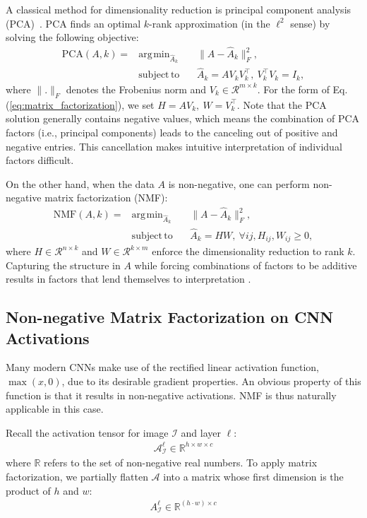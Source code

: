 \documentclass[runningheads]{llncs}
\DeclareMathOperator*{\argmin}{\arg\!\min}
\DeclareMathOperator*{\subjectto}{subject\,to\,}
\begin{document}
	A classical method for dimensionality reduction is principal component analysis (PCA)~\cite{jolliffe1986principal}.
	PCA finds an optimal $k$-rank approximation (in the $\ell^2$ sense) by solving the following objective:
	\begin{equation}
	\begin{aligned}
	\text{PCA}(A, k) = & \argmin_{\hat{A}_k}
	& & \|A-\hat{A}_k \|_F^2, \\
	& \subjectto
	& & \hat{A}_k = AV_kV_k^\top,~V_k^\top V_k = I_k,
	\end{aligned}
	\end{equation}
	where $\|.\|_F$ denotes the Frobenius norm and $V_k\in\mathcal{R}^{m\times k}$. For the form of Eq. (\ref{eq:matrix_factorization}), we set $H=AV_k,~W=V_k^\top$. Note that the PCA solution generally contains negative values, which means the  combination of PCA factors (i.e., principal components) leads to the canceling out of positive and negative entries. This cancellation makes intuitive interpretation of individual factors difficult.
	
	On the other hand, when the data $A$ is non-negative, one can perform non-negative matrix factorization (NMF):
	\begin{equation}
	\begin{aligned}
	\text{NMF}(A, k) = & \argmin_{\hat{A}_k}
	& & \|A-\hat{A}_k \|_F^2, \\
	& \subjectto
	& & \hat{A}_k = HW,~ \forall ij, H_{ij} ,W_{ij} \geq 0,
	\end{aligned}
	\end{equation}
	where $H\in\mathcal{R}^{n\times k}$ and $W\in\mathcal{R}^{k\times m}$ enforce the dimensionality reduction to rank $k$. Capturing the structure in $A$ while forcing combinations of factors to be additive results in factors that lend themselves to interpretation \cite{lee1999learning}.
	
	
	\subsection{Non-negative Matrix Factorization on CNN Activations} \label{sec: NMF on CNN Activations}
	Many modern CNNs make use of the rectified linear activation function, $\max(x, 0)$, due to its desirable gradient properties. An obvious property of this function is that it results in non-negative activations. NMF is thus naturally applicable in this case.
	
	Recall the activation tensor for image $\mathcal{I}$ and layer $\ell$:
	\begin{align}
	\mathcal{A}_\mathcal{I}^\ell \in \mathbb{R}^{h\times w\times c}
	\end{align}where $\mathbb{R}$ refers to the set of non-negative real numbers. To apply matrix factorization, we partially flatten $\mathcal{A}$ into a matrix whose first dimension is the product of $h$ and $w$:
	\begin{align}
	A_\mathcal{I}^\ell \in \mathbb{R}^{(h\cdot w)\times c}
	\end{align}
	
\end{document}
